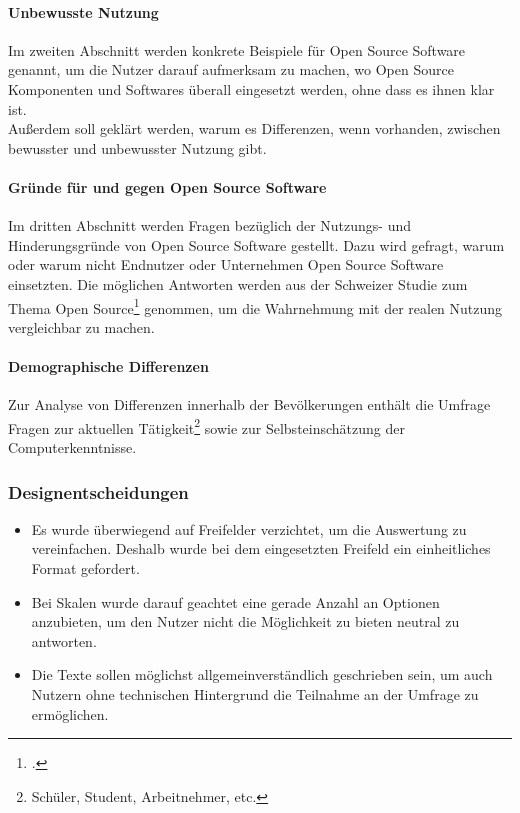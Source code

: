 \documentclass[a4paper]{article}
\begin{document}
    			\paragraph{Unbewusste Nutzung}
    				Im zweiten Abschnitt werden konkrete Beispiele für Open Source Software genannt, um die Nutzer darauf aufmerksam zu machen, wo Open Source Komponenten und Softwares überall eingesetzt werden, ohne dass es ihnen klar ist.\\
    				Außerdem soll geklärt werden, warum es Differenzen, wenn vorhanden, zwischen bewusster und unbewusster Nutzung gibt.
    			
    			\paragraph{Gründe für und gegen Open Source Software}
    				Im dritten Abschnitt werden Fragen bezüglich der Nutzungs- und Hinderungsgründe von Open Source Software gestellt. Dazu wird gefragt, warum oder warum nicht Endnutzer oder Unternehmen Open Source Software einsetzten. Die möglichen Antworten werden aus der Schweizer Studie zum Thema Open Source\footcite{oss:studie} genommen, um die Wahrnehmung mit der realen Nutzung vergleichbar zu machen.
    			
    			\paragraph{Demographische Differenzen}
    				Zur Analyse von Differenzen innerhalb der Bevölkerungen enthält die Umfrage Fragen zur aktuellen Tätigkeit\footnote{Schüler, Student, Arbeitnehmer, etc.} sowie zur Selbsteinschätzung der Computerkenntnisse.
				
			\subsubsection{Designentscheidungen}
			 \begin{itemize}
			     \item Es wurde überwiegend auf Freifelder verzichtet, um die Auswertung zu vereinfachen. Deshalb wurde bei dem eingesetzten Freifeld ein einheitliches Format gefordert.
				\item Bei Skalen wurde darauf geachtet eine gerade Anzahl an Optionen anzubieten, um den Nutzer nicht die Möglichkeit zu bieten neutral zu antworten.
				\item Die Texte sollen möglichst allgemeinverständlich geschrieben sein, um auch Nutzern ohne technischen Hintergrund die Teilnahme an der Umfrage zu ermöglichen.
			 \end{itemize}
			     
\end{document}
